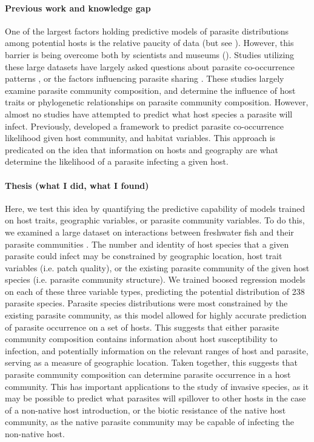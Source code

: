 \documentclass[12pt]{article}
\begin{document}
 \paragraph{Previous work and knowledge gap}
  One of the largest factors holding predictive models of parasite distributions among potential hosts is the relative paucity of data (but see \cite{}). However, this barrier is being overcome both by scientists \cite{strona2012, nunn2005} and museums (\cite{gibson2005}). Studies utilizing these large datasets have largely asked questions about parasite co-occurrence patterns \cite{strona2013}, or the factors influencing parasite sharing \cite{braga2014, dallas2014b}. These studies largely examine parasite community composition, and determine the influence of host traits or phylogenetic relationships on parasite community composition. However, almost no studies have attempted to predict what host species a parasite will infect. Previously, \citet{strona2013} developed a framework to predict parasite co-occurrence likelihood given host community, and habitat variables. This approach is predicated on the idea that information on hosts and geography are what determine the likelihood of a parasite infecting a given host. 

  
 \paragraph{Thesis (what I did, what I found)}
    
  Here, we test this idea by quantifying the predictive capability of models trained on host traits, geographic variables, or parasite community variables. To do this, we examined a large dataset on interactions between freshwater fish and their parasite communities \cite{strona2012}. The number and identity of host species that a given parasite could infect may be constrained by geographic location, host trait variables (i.e. patch quality), or the existing parasite community of the given host species (i.e. parasite community structure). We trained boosed regression models on each of these three variable types, predicting the potential distribution of 238 parasite species. Parasite species distributions were most constrained by the existing parasite community, as this model allowed for highly accurate prediction of parasite occurrence on a set of hosts. This suggests that either parasite community composition contains information about host susceptibility to infection, and potentially information on the relevant ranges of host and parasite, serving as a measure of geographic location. Taken together, this suggests that parasite community composition can determine parasite occurrence in a host community. This has important applications to the study of invasive species, as it may be possible to predict what parasites will spillover to other hosts in the case of a non-native host introduction, or the biotic resistance of the native host community, as the native parasite community may be capable of infecting the non-native host. 
  
\end{document}
